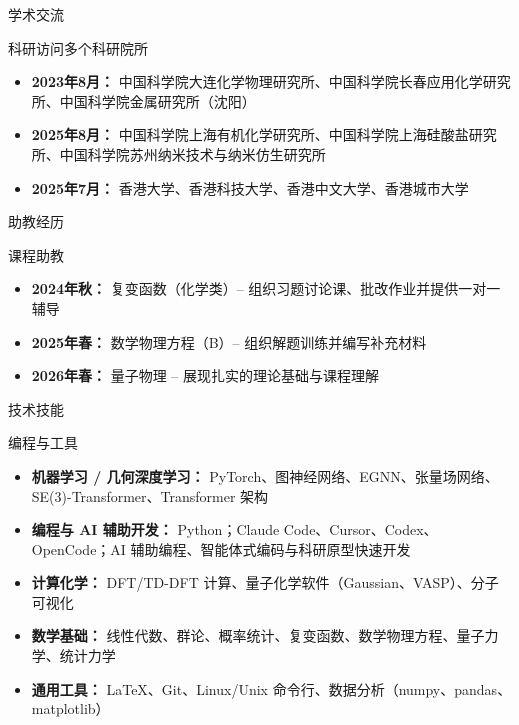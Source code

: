 \documentclass[]{mcdowellcv}
\begin{document}
\begin{cvsection}{学术交流}
	\begin{cvsubsection}{科研访问}{多个科研院所}{}
		\begin{itemize}
			\item \textbf{2023年8月：} 中国科学院大连化学物理研究所、中国科学院长春应用化学研究所、中国科学院金属研究所（沈阳）
			\item \textbf{2025年8月：} 中国科学院上海有机化学研究所、中国科学院上海硅酸盐研究所、中国科学院苏州纳米技术与纳米仿生研究所
			\item \textbf{2025年7月：} 香港大学、香港科技大学、香港中文大学、香港城市大学
		\end{itemize}
	\end{cvsubsection}
\end{cvsection}

\begin{cvsection}{助教经历}
	\begin{cvsubsection}{课程助教}{}{}
		\begin{itemize}
			\item \textbf{2024年秋：} 复变函数（化学类）-- 组织习题讨论课、批改作业并提供一对一辅导
			\item \textbf{2025年春：} 数学物理方程（B）-- 组织解题训练并编写补充材料
			\item \textbf{2026年春：} 量子物理 -- 展现扎实的理论基础与课程理解
		\end{itemize}
	\end{cvsubsection}
\end{cvsection}

\begin{cvsection}{技术技能}
	\begin{cvsubsection}{编程与工具}{}{}
		\begin{itemize}
			\item \textbf{机器学习 / 几何深度学习：} PyTorch、图神经网络、EGNN、张量场网络、SE(3)-Transformer、Transformer 架构
			\item \textbf{编程与 AI 辅助开发：} Python；Claude Code、Cursor、Codex、OpenCode；AI 辅助编程、智能体式编码与科研原型快速开发
			\item \textbf{计算化学：} DFT/TD-DFT 计算、量子化学软件（Gaussian、VASP）、分子可视化
			\item \textbf{数学基础：} 线性代数、群论、概率统计、复变函数、数学物理方程、量子力学、统计力学
			\item \textbf{通用工具：} LaTeX、Git、Linux/Unix 命令行、数据分析（numpy、pandas、matplotlib）
		\end{itemize}
	\end{cvsubsection}
\end{cvsection}
\end{document}
